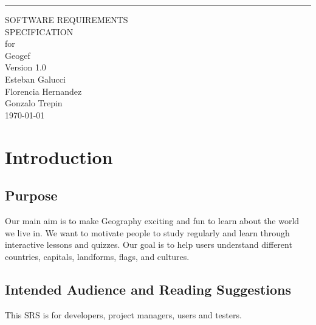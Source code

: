 \documentclass{scrreprt}
\date{}
\def\myversion{1.0 }
\begin{document}
\begin{flushright}
    \rule{16cm}{5pt}\vskip1cm
    \begin{bfseries}
        \Huge{SOFTWARE REQUIREMENTS\\ SPECIFICATION}\\
        \vspace{1.5cm}
        for\\
        \vspace{1.5cm}
        Geogef\\
        \vspace{1.5cm}
        \LARGE{Version \myversion}\\
        \vspace{1.5cm}
        Esteban Galucci \\
        Florencia Hernandez \\
        Gonzalo Trepin \\
        \today\\
    \end{bfseries}
\end{flushright}

\tableofcontents

\chapter{Introduction}

\section{Purpose}

Our main aim is to make Geography exciting and fun to learn about the world we live in. We want to motivate people to study regularly and learn through interactive lessons and quizzes. Our goal is to help users understand different countries, capitals, landforms, flags, and cultures.


\section{Intended Audience and Reading Suggestions}
This SRS is for developers, project managers, users and testers. 
\end{document}
